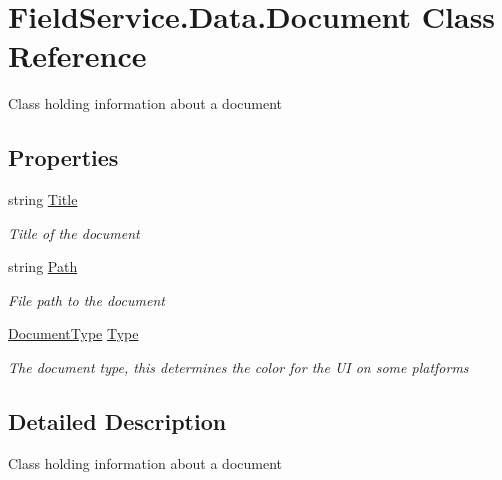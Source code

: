 \hypertarget{class_field_service_1_1_data_1_1_document}{\section{Field\+Service.\+Data.\+Document Class Reference}
\label{class_field_service_1_1_data_1_1_document}
}


Class holding information about a document  


\subsection*{Properties}
\begin{DoxyCompactItemize}
\item 
string \hyperlink{class_field_service_1_1_data_1_1_document_af92a5f47393e199f8909bcf2aa0c13e2}{Title}
\begin{DoxyCompactList}\small\item\em Title of the document \end{DoxyCompactList}\item 
string \hyperlink{class_field_service_1_1_data_1_1_document_aae4ed3cf3bd0a2a557f4d24579bb0112}{Path}
\begin{DoxyCompactList}\small\item\em File path to the document \end{DoxyCompactList}\item 
\hyperlink{namespace_field_service_1_1_data_a3f59e9016ae4f76b12fee13c8594ca72}{Document\+Type} \hyperlink{class_field_service_1_1_data_1_1_document_aa7b74e1c242b948ff58daa73cd282d37}{Type}
\begin{DoxyCompactList}\small\item\em The document type, this determines the color for the U\+I on some platforms \end{DoxyCompactList}\end{DoxyCompactItemize}


\subsection{Detailed Description}
Class holding information about a document 



